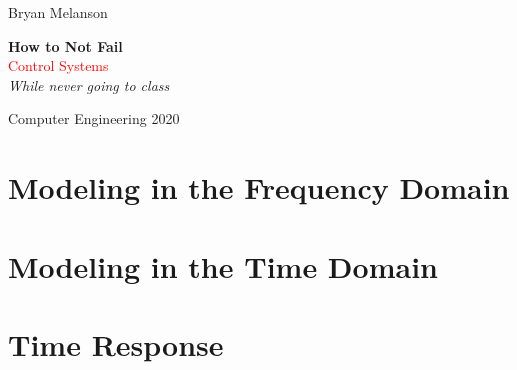 \documentclass[11pt]{article}
\newcommand*{\plogo}{\fbox{$\mathcal{BM}$}}
\begin{document}
 
        
    \begin{titlepage}
    
        \raggedleft
        
        \vspace*{\baselineskip}
        
        {\Large Bryan Melanson}
        
        \vspace*{0.167\textheight}
        
        \textbf{\LARGE How to Not Fail}\\[\baselineskip]
        
        {\textcolor{Red}{\Huge Control Systems}}\\[\baselineskip]
        
        {\Large \textit{While never going to class}}
        
        \vfill
        
        {\large Computer Engineering 2020 ~~\plogo}
        
        \vspace*{3\baselineskip}
    
    \end{titlepage}

    \pagebreak


    \tableofcontents

    \pagebreak


    \section{Modeling in the Frequency Domain}

    \pagebreak

    
    \section{Modeling in the Time Domain}
    
    \pagebreak

    
    \section{Time Response}
    
\end{document}
